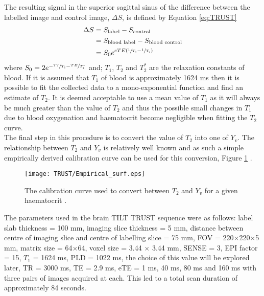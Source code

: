 The resulting signal in the superior sagittal sinus of the difference between the labelled image and control image, $\Delta S$, is defined by Equation \eqref{eq:TRUST}
\begin{align}
\Delta S&=S_{\text{label}}-S_{\text{control}}\nonumber\\
&=S_{\text{blood label}}-S_{\text{blood control}}\nonumber\\
&=S_0e^{eTE\left(\sfrac{1}{T_1}-\sfrac{1}{T_2}\right)}
\label{eq:TRUST}
\end{align}  
where $S_0=2e^{-\sfrac{TI}{T_1}-\sfrac{TE}{T_2^*}}$ and; $T_1$, $T_2$ and $T_2^*$ are the relaxation constants of blood. If it is assumed that $T_1$ of blood is approximately 1624 ms \cite{lu_determining_2004} then it is possible to fit the collected data to a mono-exponential function and find an estimate of $T_2$. It is deemed acceptable to use a mean value of $T_1$ as it will always be much greater than the value of $T_2$ and thus the possible small changes in $T_1$ due to blood oxygenation and haematocrit become negligible when fitting the $T_2$ curve.\\

The final step in this procedure is to convert the value of $T_2$ into one of $Y_v$. The relationship between $T_2$ and $Y_v$ is relatively well known and as such a simple empirically derived calibration curve can be used for this conversion, Figure \ref{fig:calibration_curve} \cite{gardener_dependence_2010, silvennoinen_comparison_2003, liu_t1_2016}.\\

\begin{figure}[H]
	\centering
	\texttt{[image: TRUST/Empirical\_surf.eps]}
	\caption{The calibration curve used to convert between $T_2$ and $Y_v$ for a given haematocrit \cite{lu_calibration_2012}.}
	\label{fig:calibration_curve}	
\end{figure}

The parameters used in the brain \ac{TILT} \ac{TRUST} sequence were as follows: label slab thickness = 100 mm, imaging slice thickness = 5 mm, distance between centre of imaging slice and centre of labelling slice = 75 mm, \ac{FOV} = 220$\times$220$\times$5 mm, matrix size = 64$\times$64, voxel size = 3.44 $\times$ 3.44 mm, \ac{SENSE} = 3, \ac{EPI} factor = 15, $T_1$ = 1624 ms, \ac{PLD} = 1022 ms, the choice of this value will be explored later, \ac{TR} = 3000 ms, \ac{TE} = 2.9 ms, \ac{eTE} = 1 ms, 40 ms, 80 ms and 160 ms with three pairs of images acquired at each. This led to a total scan duration of approximately 84 seconds.\\

